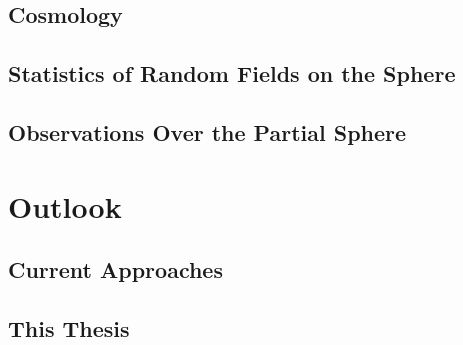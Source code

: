 \subsection{Cosmology}

\subsection{Statistics of Random Fields on the Sphere}

\subsection{Observations Over the Partial Sphere}

\section{Outlook}

\subsection{Current Approaches}

\subsection{This Thesis}
